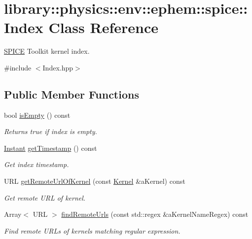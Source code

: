 \hypertarget{classlibrary_1_1physics_1_1env_1_1ephem_1_1spice_1_1_index}{}\section{library\+:\+:physics\+:\+:env\+:\+:ephem\+:\+:spice\+:\+:Index Class Reference}
\label{classlibrary_1_1physics_1_1env_1_1ephem_1_1spice_1_1_index}


\hyperlink{classlibrary_1_1physics_1_1env_1_1ephem_1_1_s_p_i_c_e}{S\+P\+I\+CE} Toolkit kernel index.  




{\ttfamily \#include $<$Index.\+hpp$>$}

\subsection*{Public Member Functions}
\begin{DoxyCompactItemize}
\item 
bool \hyperlink{classlibrary_1_1physics_1_1env_1_1ephem_1_1spice_1_1_index_afca3a26311c0f33d6ae4e84d47732ef0}{is\+Empty} () const
\begin{DoxyCompactList}\small\item\em Returns true if index is empty. \end{DoxyCompactList}\item 
\hyperlink{classlibrary_1_1physics_1_1time_1_1_instant}{Instant} \hyperlink{classlibrary_1_1physics_1_1env_1_1ephem_1_1spice_1_1_index_a76685c1763f2733504dc9ad62350c846}{get\+Timestamp} () const
\begin{DoxyCompactList}\small\item\em Get index timestamp. \end{DoxyCompactList}\item 
U\+RL \hyperlink{classlibrary_1_1physics_1_1env_1_1ephem_1_1spice_1_1_index_a6ac6977e717c7399433dc06b306a75a3}{get\+Remote\+Url\+Of\+Kernel} (const \hyperlink{classlibrary_1_1physics_1_1env_1_1ephem_1_1spice_1_1_kernel}{Kernel} \&a\+Kernel) const
\begin{DoxyCompactList}\small\item\em Get remote U\+RL of kernel. \end{DoxyCompactList}\item 
Array$<$ U\+RL $>$ \hyperlink{classlibrary_1_1physics_1_1env_1_1ephem_1_1spice_1_1_index_acfd311a7525e0ad9e03b1673d2a0da99}{find\+Remote\+Urls} (const std\+::regex \&a\+Kernel\+Name\+Regex) const
\begin{DoxyCompactList}\small\item\em Find remote U\+R\+Ls of kernels matching regular expression. \end{DoxyCompactList}\end{DoxyCompactItemize}
